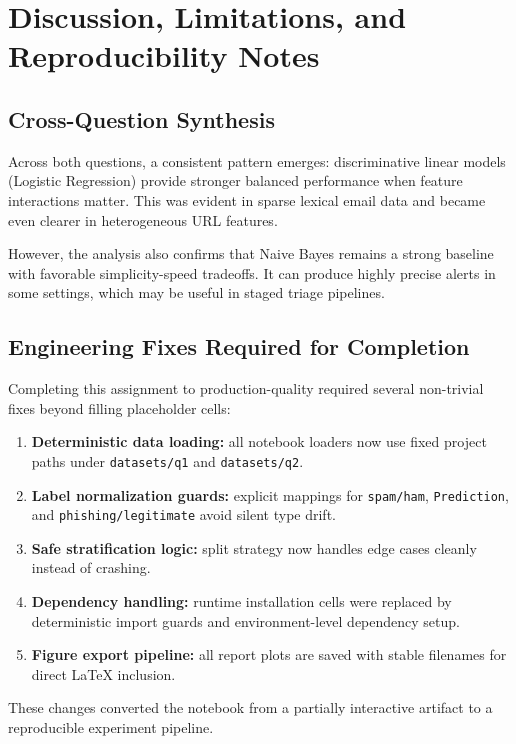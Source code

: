 \section{Discussion, Limitations, and Reproducibility Notes}

\subsection{Cross-Question Synthesis}

Across both questions, a consistent pattern emerges: discriminative linear models (Logistic Regression) provide stronger balanced performance when feature interactions matter. This was evident in sparse lexical email data and became even clearer in heterogeneous URL features.

However, the analysis also confirms that Naive Bayes remains a strong baseline with favorable simplicity-speed tradeoffs. It can produce highly precise alerts in some settings, which may be useful in staged triage pipelines.

\subsection{Engineering Fixes Required for Completion}

Completing this assignment to production-quality required several non-trivial fixes beyond filling placeholder cells:
\begin{enumerate}
    \item \textbf{Deterministic data loading:} all notebook loaders now use fixed project paths under \texttt{datasets/q1} and \texttt{datasets/q2}.
    \item \textbf{Label normalization guards:} explicit mappings for \texttt{spam/ham}, \texttt{Prediction}, and \texttt{phishing/legitimate} avoid silent type drift.
    \item \textbf{Safe stratification logic:} split strategy now handles edge cases cleanly instead of crashing.
    \item \textbf{Dependency handling:} runtime installation cells were replaced by deterministic import guards and environment-level dependency setup.
    \item \textbf{Figure export pipeline:} all report plots are saved with stable filenames for direct LaTeX inclusion.
\end{enumerate}

These changes converted the notebook from a partially interactive artifact to a reproducible experiment pipeline.


